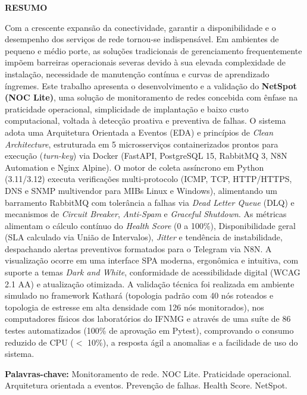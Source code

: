 \documentclass[12pt,a4paper]{article}
\newcommand{\pretextualtitle}[1]{\begin{center}\textbf{\MakeUppercase{#1}}\end{center}\vspace{1em}}
\begin{document}
\pretextualtitle{RESUMO}
Com a crescente expansão da conectividade, garantir a disponibilidade e o desempenho dos serviços de rede tornou-se indispensável. Em ambientes de pequeno e médio porte, as soluções tradicionais de gerenciamento frequentemente impõem barreiras operacionais severas devido à sua elevada complexidade de instalação, necessidade de manutenção contínua e curvas de aprendizado íngremes. Este trabalho apresenta o desenvolvimento e a validação do \textbf{NetSpot (NOC Lite)}, uma solução de monitoramento de redes concebida com ênfase na praticidade operacional, simplicidade de implantação e baixo custo computacional, voltada à detecção proativa e preventiva de falhas. O sistema adota uma Arquitetura Orientada a Eventos (EDA) e princípios de \textit{Clean Architecture}, estruturada em 5 microsserviços containerizados prontos para execução (\textit{turn-key}) via Docker (FastAPI, PostgreSQL 15, RabbitMQ 3, N8N Automation e Nginx Alpine). O motor de coleta assíncrono em Python (3.11/3.12) executa verificações multi-protocolo (ICMP, TCP, HTTP/HTTPS, DNS e SNMP multivendor para MIBs Linux e Windows), alimentando um barramento RabbitMQ com tolerância a falhas via \textit{Dead Letter Queue} (DLQ) e mecanismos de \textit{Circuit Breaker}, \textit{Anti-Spam} e \textit{Graceful Shutdown}. As métricas alimentam o cálculo contínuo do \textit{Health Score} (0 a 100\%), Disponibilidade geral (SLA calculado via União de Intervalos), \textit{Jitter} e tendência de instabilidade, despachando alertas preventivos formatados para o Telegram via N8N. A visualização ocorre em uma interface SPA moderna, ergonômica e intuitiva, com suporte a temas \textit{Dark and White}, conformidade de acessibilidade digital (WCAG 2.1 AA) e atualização otimizada. A validação técnica foi realizada em ambiente simulado no framework Kathará (topologia padrão com 40 nós roteados e topologia de estresse em alta densidade com 126 nós monitorados), nos computadores físicos dos laboratórios do IFNMG e através de uma suíte de 86 testes automatizados (100\% de aprovação em Pytest), comprovando o consumo reduzido de CPU ($<$ 10\%), a resposta ágil a anomalias e a facilidade de uso do sistema.

\vspace{1em}
\noindent\textbf{Palavras-chave:} Monitoramento de rede. NOC Lite. Praticidade operacional. Arquitetura orientada a eventos. Prevenção de falhas. Health Score. NetSpot.
\clearpage
\end{document}
